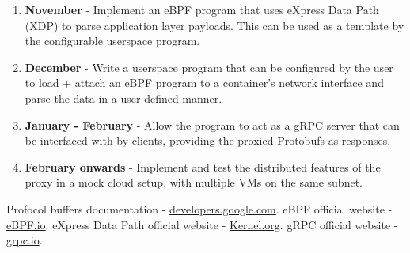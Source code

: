 \documentclass[12pt]{article}
\begin{document}
\begin{enumerate}
    \item \textbf{November} - Implement an eBPF \cite{ebpf} program that uses eXpress Data Path (XDP) \cite{xdp} to parse application layer payloads. This can be used as a template by the configurable userspace program.
    \item \textbf{December} - Write a userspace program that can be configured by the user to load + attach an eBPF program to a container's network interface and parse the data in a user-defined manner.
    \item \textbf{January - February} - Allow the program to act as a gRPC \cite{grpc} server that can be interfaced with by clients, providing the proxied Protobufs as responses.
    \item \textbf{February onwards} - Implement and test the distributed features of the proxy in a mock cloud setup, with multiple VMs on the same subnet.
\end{enumerate}

\begin{thebibliography}{9}
        Profocol buffers documentation - \href{https://developers.google.com/protocol-buffers}{developers.google.com}.
        eBPF official website - \href{http://ebpf.io}{eBPF.io}.
        eXpress Data Path official website - \href{https://www.kernel.org/doc/Documentation/networking/x_tables.txt}{Kernel.org}.
        gRPC official website - \href{https://grpc.io}{grpc.io}.
\end{thebibliography}
\end{document}
